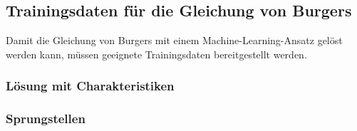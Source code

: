 %
%
%
\subsection{Trainingsdaten für die Gleichung von Burgers}
Damit die Gleichung von Burgers mit einem Machine-Learning-Ansatz gelöst
werden kann, müssen geeignete Trainingsdaten bereitgestellt werden.

\subsubsection{Lösung mit Charakteristiken}

\subsubsection{Sprungstellen}


